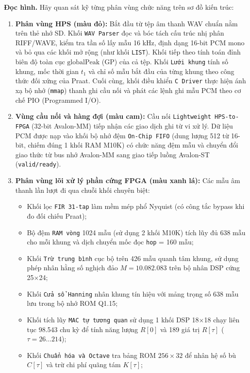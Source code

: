 \textbf{Đọc hình.} Hãy quan sát kỹ từng phân vùng chức năng trên sơ đồ kiến trúc:
\begin{enumerate}[leftmargin=1.5em, itemsep=3pt]
    \item \textbf{Phân vùng HPS (màu đỏ):} Bắt đầu từ tệp âm thanh WAV chuẩn nằm trên thẻ nhớ SD. Khối \texttt{WAV Parser} đọc và bóc tách cấu trúc nhị phân RIFF/WAVE, kiểm tra tần số lấy mẫu 16 kHz, định dạng 16-bit PCM mono và bỏ qua các khối mở rộng (như khối \texttt{LIST}). Khối tiếp theo tính toán đỉnh biên độ toàn cục $\text{globalPeak}$ (GP) của cả tệp. Khối \texttt{Lưới khung} tính số khung, mốc thời gian $t_1$ và chỉ số mẫu bắt đầu của từng khung theo công thức đối xứng của Praat. Cuối cùng, khối điều khiển \texttt{C Driver} thực hiện ánh xạ bộ nhớ (\texttt{mmap}) thanh ghi cầu nối và phát các lệnh ghi mẫu PCM theo cơ chế PIO (Programmed I/O).
    \item \textbf{Vùng cầu nối và hàng đợi (màu cam):} Cầu nối \texttt{Lightweight HPS-to-FPGA} (32-bit Avalon-MM) tiếp nhận các giao dịch ghi từ vi xử lý. Dữ liệu PCM được nạp vào khối bộ nhớ đệm \texttt{On-Chip FIFO} (dung lượng 512 từ 16-bit, chiếm đúng 1 khối RAM M10K) có chức năng đệm mẫu và chuyển đổi giao thức từ bus nhớ Avalon-MM sang giao tiếp luồng Avalon-ST (\texttt{valid/ready}).
    \item \textbf{Phân vùng lõi xử lý phần cứng FPGA (màu xanh lá):} Các mẫu âm thanh lần lượt đi qua chuỗi khối chuyên biệt:
    \begin{itemize}[leftmargin=1.2em, itemsep=2pt]
        \item Khối lọc \texttt{FIR 31-tap} làm mềm mép phổ Nyquist (có công tắc bypass khi đo đối chiếu Praat);
        \item Bộ đệm \texttt{RAM vòng} 1024 mẫu (sử dụng 2 khối M10K) tích lũy đủ 638 mẫu cho mỗi khung và dịch chuyển mốc đọc \texttt{hop} = 160 mẫu;
        \item Khối \texttt{Trừ trung bình} cục bộ trên 426 mẫu quanh tâm khung, sử dụng phép nhân hằng số nghịch đảo $M = 10.082.083$ trên bộ nhân DSP cứng 25$\times$24;
        \item Khối \texttt{Cửa sổ Hanning} nhân khung tín hiệu với mảng trọng số 638 mẫu lưu trong bộ nhớ ROM Q1.15;
        \item Khối tích lũy \texttt{MAC tự tương quan} sử dụng 1 khối DSP 18$\times$18 chạy liên tục 98.543 chu kỳ để tính năng lượng $R[0]$ và 189 giá trị $R[\tau]$ ($\tau = 26 \dots 214$);
        \item Khối \texttt{Chuẩn hóa và Octave} tra bảng ROM $256 \times 32$ để nhân hệ số bù $C[\tau]$ và trừ chi phí quãng tám $K[\tau]$;

\end{itemize}
\end{enumerate}

